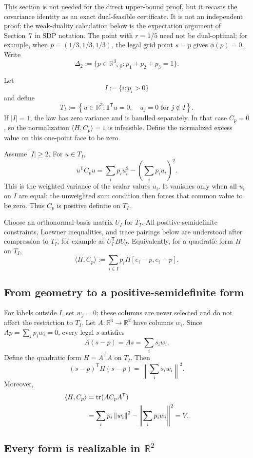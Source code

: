 \documentclass[11pt]{article}
\theoremstyle{definition}
\theoremstyle{remark}
\newcommand{\R}{\mathbb{R}}
\newcommand{\one}{\mathbf{1}}
\newcommand{\norm}[1]{\left\lVert #1\right\rVert}
\begin{document}
This section is not needed for the direct upper-bound proof, but it recasts the covariance identity as an exact dual-feasible certificate.  It is not an independent proof: the weak-duality calculation below is the expectation argument of Section~7 in SDP notation.  The point with $r=1/5$ need not be dual-optimal; for example, when $p=(1/3,1/3,1/3)$, the legal grid point $s=p$ gives $\phi(p)=0$.  Write
\[
\Delta_2:=\{p\in\R_{\ge0}^3:p_1+p_2+p_3=1\}.
\]

Let
\[
I:=\{i:p_i>0\}
\]
and define
\[
T_I:=\left\{u\in\R^3:\one^{\mathsf T}u=0,
\quad u_j=0\text{ for }j\notin I\right\}.
\]
If $|I|=1$, the law has zero variance and is handled separately.  In that case $C_p=0$, so the normalization $\langle H,C_p\rangle=1$ is infeasible.  Define the normalized excess value on this one-point face to be zero.

Assume $|I|\ge2$.  For $u\in T_I$,
\[
u^{\mathsf T}C_pu
=\sum_i p_i u_i^2-\left(\sum_i p_i u_i\right)^2.
\]
This is the weighted variance of the scalar values $u_i$.  It vanishes only when all $u_i$ on $I$ are equal; the unweighted sum condition then forces that common value to be zero.  Thus $C_p$ is positive definite on $T_I$.

Choose an orthonormal-basis matrix $U_I$ for $T_I$.  All positive-semidefinite constraints, Loewner inequalities, and trace pairings below are understood after compression to $T_I$, for example as $U_I^{\mathsf T}BU_I$.  Equivalently, for a quadratic form $H$ on $T_I$,
\[
\langle H,C_p\rangle
:=\sum_{i\in I}p_i H[e_i-p,e_i-p].
\]

\subsection{From geometry to a positive-semidefinite form}

For labels outside $I$, set $w_j=0$; these columns are never selected and do not affect the restriction to $T_I$.  Let $A:\R^3\to\R^2$ have columns $w_i$.  Since $Ap=\sum_i p_iw_i=0$, every legal $s$ satisfies
\[
A(s-p)=As=\sum_i s_iw_i.
\]
Define the quadratic form $H=A^{\mathsf T}A$ on $T_I$.  Then
\[
(s-p)^{\mathsf T}H(s-p)=\norm{\sum_i s_iw_i}^2.
\]
Moreover,
\begin{align}
\langle H,C_p\rangle
&=\operatorname{tr}(AC_pA^{\mathsf T}) \notag\\
&=\sum_i p_i\norm{w_i}^2
 -\norm{\sum_i p_iw_i}^2
=V.
\label{eq:H-variance}
\end{align}

\subsection{Every form is realizable in \texorpdfstring{$\R^2$}{R2}}
\end{document}
